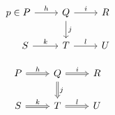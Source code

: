 \documentclass{article}
\begin{document}
\[ \begin{tikzcd}
p\in P \arrow{r}{h} & Q \arrow{d}{j}\arrow{r}{i}&R \\%
\phantom{p\in}S \arrow{r}{k}& T\arrow{r}{l}&U
\end{tikzcd}
\]

\[ \begin{tikzcd}
P \arrow[r, Rightarrow, "h"] & Q \arrow[d, Rightarrow, "j"]\arrow[r, Rightarrow, "i"]&R \\%
S \arrow[r, Rightarrow, "k"]& T\arrow[r, Rightarrow, "l"]&U
\end{tikzcd}
\]
\end{document}
